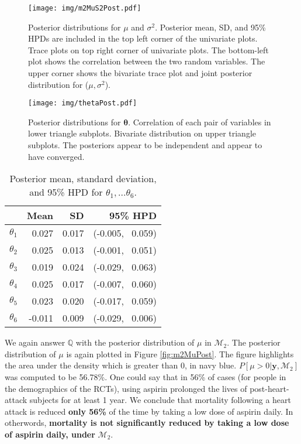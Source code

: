 \documentclass{../../tex_template/asaproc}
\newcommand{\bk}[1]{\left[#1\right]}
\newcommand{\M}{\mathcal{M}}
\newcommand{\Q}{\mathbb{Q}}
\begin{document}
\begin{figure}%
  \texttt{[image: img/m2MuS2Post.pdf]}
  \caption{Posterior distributions for $\mu$ and $\sigma^2$. Posterior
  mean, SD, and 95\% HPDs are included in the top left corner of the
  univariate plots. Trace plots on top right corner of univariate plots. The
  bottom-left plot shows the correlation between the two random variables. The
  upper corner shows the bivariate trace plot and joint posterior distribution
  for ($\mu,\sigma^2$).}
  \label{fig:m2MuS2Post}
\end{figure}

\begin{figure}%
  \texttt{[image: img/thetaPost.pdf]}
  \caption{Posterior distributions for $\bm\theta$. Correlation of each pair of
  variables in lower triangle subplots. Bivariate distribution on upper triangle
  subplots. The posteriors appear to be independent and appear to have converged.}
  \label{fig:thetaPost}
\end{figure}

%
\begin{table}[ht]
\centering
\begin{tabular}{rrrr}
  \hline
 & Mean & SD & 95\% HPD \\ 
  \hline
  $\theta_1$ & 0.027 & 0.017 & (-0.005,~ 0.059) \\ 
  $\theta_2$ & 0.025 & 0.013 & (-0.001,~ 0.051) \\ 
  $\theta_3$ & 0.019 & 0.024 & (-0.029,~ 0.063) \\ 
  $\theta_4$ & 0.025 & 0.017 & (-0.007,~ 0.060) \\ 
  $\theta_5$ & 0.023 & 0.020 & (-0.017,~ 0.059) \\ 
  $\theta_6$ &-0.011 & 0.009 & (-0.029,~ 0.006) \\ 
   \hline
\end{tabular}
\caption{Posterior mean, standard deviation, and 95\% HPD for
$\theta_1,...\theta_6$.}
\label{tab:thetaPost}
\end{table}

We again answer $\Q$ with the posterior distribution of $\mu$ in $\M_2$.  The
posterior distribution of $\mu$ is again plotted in Figure \ref{fig:m2MuPost}.
The figure highlights the area under the density which is greater than 0, in
navy blue. $P\bk{\mu>0|\bm{y},\M_2}$ was computed to be 56.78\%. One could
say that in 56\% of cases (for people in the demographics of the RCTs), using
aspirin prolonged the lives of post-heart-attack subjects for at least 1 year.
We conclude that mortality following a heart attack is reduced \textbf{only
56\%} of the time by taking a low dose of aspirin daily. In otherwords,
\textbf{mortality is not significantly reduced by taking a low dose of
aspirin daily, under} $\M_2$.
\end{document}
